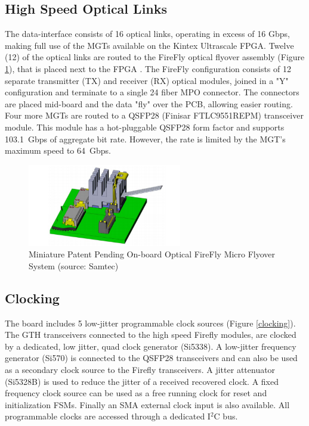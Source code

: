 \documentclass[a4paper]{PoS}
\begin{document}
\subsection{High Speed Optical Links}
The data-interface consists of 16 optical links, operating in excess of 16 Gbps, making full use of the MGTs available on the Kintex Ultrascale FPGA. Twelve (12) of the optical links are routed to the FireFly optical flyover assembly (Figure \ref{firefly}), that is placed next to the FPGA \cite{zbinden2018connector}. The FireFly configuration consists of 12 separate transmitter (TX) and receiver (RX) optical modules, joined in a "Y" configuration and terminate to a single 24 fiber MPO connector. The connectors are placed mid-board and the data "fly" over the PCB, allowing easier routing. Four more MGTs are routed to a QSFP28 (Finisar FTLC9551REPM) transceiver module. This module has a hot-pluggable QSFP28 form factor and supports 103.1~Gbps of aggregate bit rate. However, the rate is limited by the MGT's maximum speed to 64~Gbps.

\begin{figure}
\centering
\includegraphics[width=0.6\textwidth]{firefly.png}
\caption{Miniature Patent Pending On-board Optical FireFly Micro
Flyover System (source: Samtec) }
\label{firefly}
\end{figure}


\subsection{Clocking}
The board includes 5 low-jitter programmable clock sources (Figure \ref{clocking}). The GTH transceivers connected to the high speed Firefly modules, are clocked by a dedicated, low jitter, quad clock generator (Si5338). A low-jitter frequency generator (Si570) is connected to the QSFP28 transceivers and can also be used as a secondary clock source to the Firefly transceivers. A jitter attenuator (Si5328B) is used to reduce the jitter of a received recovered clock. A fixed frequency clock source can be used as a free running clock for reset and initialization FSMs. Finally an SMA external clock input is also available. All programmable clocks are accessed through a dedicated I$^2$C bus.
\end{document}
